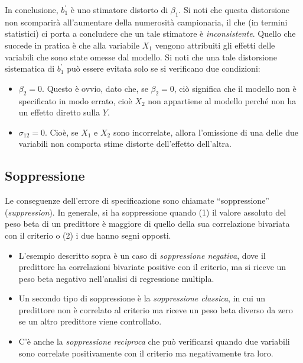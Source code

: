 \documentclass[
  11pt,
]{krantz}
\providecommand{\tightlist}{%
  \setlength{\itemsep}{0pt}\setlength{\parskip}{0pt}}
\theoremstyle{definition}
\theoremstyle{definition}
\theoremstyle{definition}
\theoremstyle{definition}
\theoremstyle{remark}
\begin{document}
In conclusione, \(b_1^\prime\) è uno stimatore distorto di \(\beta_1\). Si noti che questa distorsione non scomparirà all'aumentare della numerosità campionaria, il che (in termini statistici) ci porta a concludere che un tale stimatore è \emph{inconsistente}. Quello che succede in pratica è che alla variabile \(X_1\) vengono attribuiti gli effetti delle variabili che sono state omesse dal modello. Si noti che una tale distorsione sistematica di \(b_1^\prime\) può essere evitata solo se si verificano due condizioni:

\begin{itemize}
\tightlist
\item
  \(\beta_2 = 0\). Questo è ovvio, dato che, se \(\beta_2 = 0\), ciò significa che il modello non è specificato in modo errato, cioè \(X_2\) non appartiene al modello perché non ha un effetto diretto sulla \(Y\).
\item
  \(\sigma_{12} = 0\). Cioè, se \(X_1\) e \(X_2\) sono incorrelate, allora l'omissione di una delle due variabili non comporta stime distorte dell'effetto dell'altra.
\end{itemize}

\hypertarget{soppressione}{%
\subsection{Soppressione}\label{soppressione}}

Le conseguenze dell'errore di specificazione sono chiamate ``soppressione'' (\emph{suppression}). In generale, si ha soppressione quando (1) il valore assoluto del peso beta di un predittore è maggiore di quello della sua correlazione bivariata con il criterio o (2) i due hanno segni opposti.

\begin{itemize}
\tightlist
\item
  L'esempio descritto sopra è un caso di \emph{soppressione negativa}, dove il predittore ha correlazioni bivariate positive con il criterio, ma si riceve un peso beta negativo nell'analisi di regressione multipla.
\item
  Un secondo tipo di soppressione è la \emph{soppressione classica}, in cui un predittore non è correlato al criterio ma riceve un peso beta diverso da zero se un altro predittore viene controllato.
\item
  C'è anche la \emph{soppressione reciproca} che può verificarsi quando due variabili sono correlate positivamente con il criterio ma negativamente tra loro.
\end{itemize}
\end{document}
